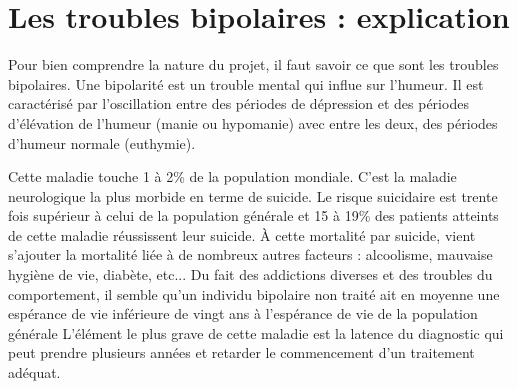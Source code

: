 \section{Les troubles bipolaires : explication}

Pour bien comprendre la nature du projet, il faut savoir ce que sont les troubles bipolaires.
Une bipolarité est un trouble mental qui influe sur l'humeur. Il est caractérisé par l'oscillation entre des périodes de dépression et des périodes d'élévation de l'humeur (manie ou hypomanie) avec entre les deux,
des périodes d'humeur \og{} normale \fg{} (euthymie).

Cette maladie touche 1 à 2\% de la population mondiale. C'est  la maladie neurologique la plus morbide en terme de suicide. Le risque suicidaire est trente fois supérieur à celui de la population générale et 15 à 19\% des patients atteints de cette maladie \og{} réussissent \fg{} leur suicide. À cette mortalité par suicide, vient s’ajouter la mortalité liée à de nombreux autres facteurs :  alcoolisme, mauvaise hygiène de vie, diabète, etc... Du fait des addictions diverses et des troubles du comportement, il semble qu’un individu bipolaire non traité ait en moyenne une espérance de vie inférieure de vingt ans à l'espérance de vie de la population générale
L'élément le plus grave de cette maladie est la latence du diagnostic qui peut prendre plusieurs années et retarder le commencement d'un traitement adéquat. 
